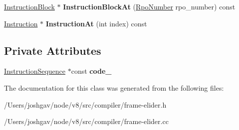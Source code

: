\begin{DoxyCompactItemize}
\item 
\hyperlink{classv8_1_1internal_1_1compiler_1_1_instruction_block}{Instruction\+Block} $\ast$ {\bfseries Instruction\+Block\+At} (\hyperlink{classv8_1_1internal_1_1compiler_1_1_rpo_number}{Rpo\+Number} rpo\+\_\+number) const \hypertarget{classv8_1_1internal_1_1compiler_1_1_frame_elider_ad88cba5ae3bdbca24a0a3aec2c1e0edd}{}\label{classv8_1_1internal_1_1compiler_1_1_frame_elider_ad88cba5ae3bdbca24a0a3aec2c1e0edd}

\item 
\hyperlink{classv8_1_1internal_1_1compiler_1_1_instruction}{Instruction} $\ast$ {\bfseries Instruction\+At} (int index) const \hypertarget{classv8_1_1internal_1_1compiler_1_1_frame_elider_a40acb1d9656ef060e00dae6bcf330dd0}{}\label{classv8_1_1internal_1_1compiler_1_1_frame_elider_a40acb1d9656ef060e00dae6bcf330dd0}

\end{DoxyCompactItemize}
\subsection*{Private Attributes}
\begin{DoxyCompactItemize}
\item 
\hyperlink{classv8_1_1internal_1_1compiler_1_1_instruction_sequence}{Instruction\+Sequence} $\ast$const {\bfseries code\+\_\+}\hypertarget{classv8_1_1internal_1_1compiler_1_1_frame_elider_a66003b62f28900fe7194193abf4a364d}{}\label{classv8_1_1internal_1_1compiler_1_1_frame_elider_a66003b62f28900fe7194193abf4a364d}

\end{DoxyCompactItemize}


The documentation for this class was generated from the following files\+:\begin{DoxyCompactItemize}
\item 
/\+Users/joshgav/node/v8/src/compiler/frame-\/elider.\+h\item 
/\+Users/joshgav/node/v8/src/compiler/frame-\/elider.\+cc\end{DoxyCompactItemize}
